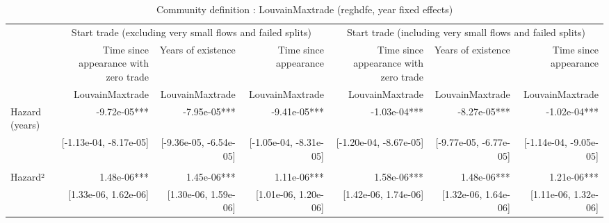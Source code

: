 \begin{table}[!h]
\caption{Community definition : LouvainMaxtrade (reghdfe, year fixed effects)}
\centering
\begin{tabular}{lllllll}
\cline{1-7}
\multicolumn{1}{c}{} &
  \multicolumn{3}{|c}{Start trade (excluding very small flows and failed splits)} &
  \multicolumn{3}{c}{Start trade (including very small flows and failed splits)} \\
\multicolumn{1}{c}{} &
  \multicolumn{1}{|r}{Time since appearance with zero trade} &
  \multicolumn{1}{r}{Years of existence} &
  \multicolumn{1}{r}{Time since appearance} &
  \multicolumn{1}{r}{Time since appearance with zero trade} &
  \multicolumn{1}{r}{Years of existence} &
  \multicolumn{1}{r}{Time since appearance} \\
\multicolumn{1}{c}{} &
  \multicolumn{1}{|r}{LouvainMaxtrade} &
  \multicolumn{1}{r}{LouvainMaxtrade} &
  \multicolumn{1}{r}{LouvainMaxtrade} &
  \multicolumn{1}{r}{LouvainMaxtrade} &
  \multicolumn{1}{r}{LouvainMaxtrade} &
  \multicolumn{1}{r}{LouvainMaxtrade} \\
\cline{1-7}
\multicolumn{1}{l}{Hazard (years)} &
  \multicolumn{1}{|r}{-9.72e-05***} &
  \multicolumn{1}{r}{-7.95e-05***} &
  \multicolumn{1}{r}{-9.41e-05***} &
  \multicolumn{1}{r}{-1.03e-04***} &
  \multicolumn{1}{r}{-8.27e-05***} &
  \multicolumn{1}{r}{-1.02e-04***} \\
\multicolumn{1}{l}{} &
  \multicolumn{1}{|r}{[-1.13e-04, -8.17e-05]} &
  \multicolumn{1}{r}{[-9.36e-05, -6.54e-05]} &
  \multicolumn{1}{r}{[-1.05e-04, -8.31e-05]} &
  \multicolumn{1}{r}{[-1.20e-04, -8.67e-05]} &
  \multicolumn{1}{r}{[-9.77e-05, -6.77e-05]} &
  \multicolumn{1}{r}{[-1.14e-04, -9.05e-05]} \\
\multicolumn{1}{l}{} &
  \multicolumn{1}{|r}{} &
  \multicolumn{1}{r}{} &
  \multicolumn{1}{r}{} &
  \multicolumn{1}{r}{} &
  \multicolumn{1}{r}{} &
  \multicolumn{1}{r}{} \\
\multicolumn{1}{l}{Hazard²} &
  \multicolumn{1}{|r}{1.48e-06***} &
  \multicolumn{1}{r}{1.45e-06***} &
  \multicolumn{1}{r}{1.11e-06***} &
  \multicolumn{1}{r}{1.58e-06***} &
  \multicolumn{1}{r}{1.48e-06***} &
  \multicolumn{1}{r}{1.21e-06***} \\
\multicolumn{1}{l}{} &
  \multicolumn{1}{|r}{[1.33e-06,  1.62e-06]} &
  \multicolumn{1}{r}{[1.30e-06,  1.59e-06]} &
  \multicolumn{1}{r}{[1.01e-06,  1.20e-06]} &
  \multicolumn{1}{r}{[1.42e-06,  1.74e-06]} &
  \multicolumn{1}{r}{[1.32e-06,  1.64e-06]} &
  \multicolumn{1}{r}{[1.11e-06,  1.32e-06]} \\

\end{tabular}
\end{table}
